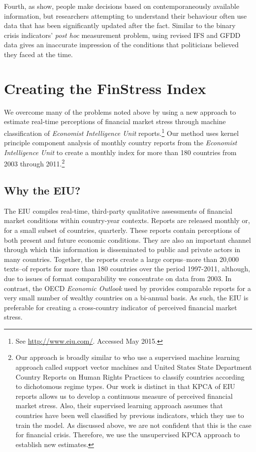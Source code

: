 \documentclass[]{article}
\begin{document}
Fourth, as \cite{KayserLeininger2015} show, people make decisions based on contemporaneously available information, but researchers attempting to understand their behaviour often use data that has been significantly updated after the fact. Similar to the binary crisis indicators' \textit{post hoc} measurement problem, using revised IFS and GFDD data gives an inaccurate impression of the conditions that politicians believed they faced at the time.

\section{Creating the FinStress Index}

We overcome many of the problems noted above by using a new approach to estimate real-time perceptions of financial market stress through machine classification of \emph{Economist Intelligence Unit} reports.\footnote{See \url{http://www.eiu.com/}. Accessed May 2015.} Our method uses kernel principle component analysis \citep{Scholkopf1998,lodhi2002,Spirling2012} of monthly country reports from the \emph{Economist Intelligence Unit} to create a monthly index for more than 180 countries from 2003 through 2011.\footnote{Our approach is broadly similar to \cite{Minhas2015} who use a supervised machine learning approach called support vector machines and United States State Department Country Reports on Human Rights Practices to classify countries according to dichotomous regime types. Our work is distinct in that KPCA of EIU reports allows us to develop a continuous measure of perceived financial market stress. Also, their supervised learning approach assumes that countries have been well classified by previous indicators, which they use to train the model. As discussed above, we are not confident that this is the case for financial crisis. Therefore, we use the unsupervised KPCA approach to establish new estimates.}

\subsection{Why the EIU?}\label{why-the-eiu}

The EIU compiles real-time, third-party qualitative assessments of financial market conditions within country-year contexts. Reports are released monthly or, for a small subset of countries, quarterly. These reports contain perceptions of both present and future economic conditions. They are also an important channel through which this information is disseminated to public and private actors in many countries. Together, the reports create a large corpus--more than 20,000 texts--of reports for more than 180 countries over the period 1997-2011, although, due to issues of format comparability we concentrate on data from 2003. In contrast, the OECD \emph{Economic Outlook} used by \cite{Romer2015} provides comparable reports for a very small number of wealthy countries on a bi-annual basis. As such, the EIU is preferable for creating a cross-country indicator of perceived financial market stress.
\end{document}
